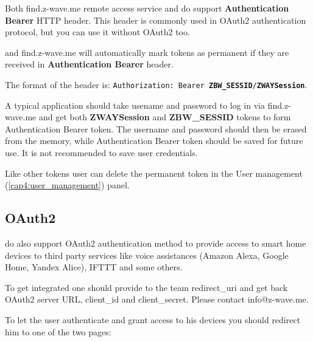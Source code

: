 Both find.z-wave.me remote access service and \zway do support \textbf{Authentication Bearer} HTTP header. This header is commonly used in OAuth2 authentication protocol, but you can use it without OAuth2 too.

\zway and find.z-wave.me will automatically mark tokens as permanent if they are received in \textbf{Authentication Bearer} header.

The format of the header is: \texttt{Authorization: Bearer \textbf{ZBW\_SESSID}/\textbf{ZWAYSession}}.

A typical application should take usename and password to log in via find.z-wave.me and get both \textbf{ZWAYSession} and \textbf{ZBW\_SESSID} tokens to form Authentication Bearer token.
The username and password should then be erased from the memory, while Authentication Bearer token should be saved for future use. It is not recommended to save user credentials.

Like other tokens user can delete the permanent token in the User management (\ref{cap4:user_management}) panel.

\subsection{OAuth2}
\label{cap:authentication_oauth2}

\zway do also support OAuth2 authentication method to provide access to smart home devices to third party services like voice assistances (Amazon Alexa, Google Home, Yandex Alice), IFTTT and some others.

To get integrated one should provide to the \zwaveme team redirect\_uri and get back OAuth2 server URL, client\_id and client\_secret. Please contact info@z-wave.me.

To let the user authenticate and grant access to his devices you should redirect him to one of the two pages:

